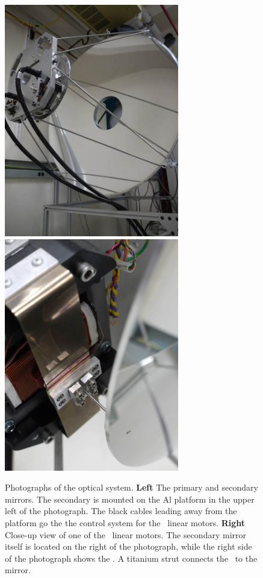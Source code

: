 \begin{figure}
\centering
\includegraphics[width=3in]{images/optics.jpg}
\includegraphics[width=3in]{images/optics-bose.jpg}
\caption[Photographs of the optical system]{
  Photographs of the optical system.
  \textbf{Left} The primary and secondary mirrors.
  The secondary is mounted on the Al platform in the upper left of the photograph.
  The black cables leading away from the platform go the the control system for the \BOSE\ linear motors.
  \textbf{Right} Close-up view of one of the \BOSE\ linear motors.
  The secondary mirror itself is located on the right of the photograph, while the right side of the photograph shows the \BOSE.
  A titanium strut connects the \BOSE\ to the mirror.
}
\label{fig:ch4-optics}
\end{figure}

